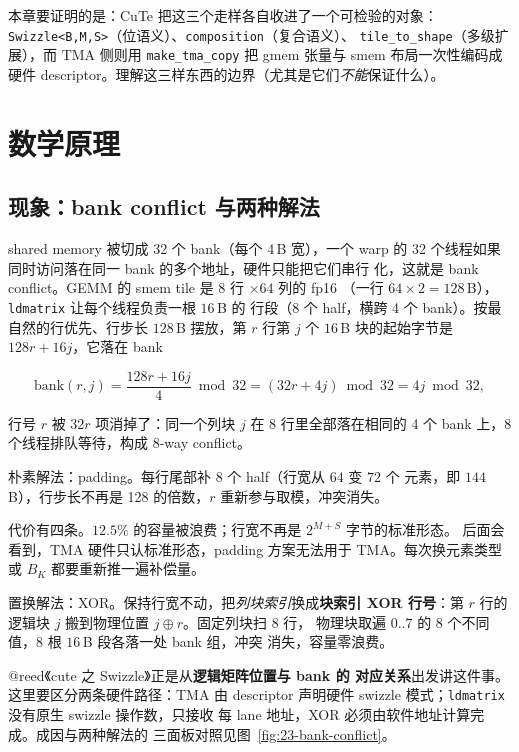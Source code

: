 本章要证明的是：CuTe 把这三个走样各自收进了一个可检验的对象：
\texttt{Swizzle\allowbreak{}<B,\allowbreak{}M,\allowbreak{}S>}（位语义）、\texttt{composition}（复合语义）、
\texttt{tile\_\allowbreak{}to\_\allowbreak{}shape}（多级扩展），而 TMA 侧则用
\texttt{make\_\allowbreak{}tma\_\allowbreak{}copy} 把 gmem 张量与 smem 布局一次性编码成硬件
descriptor。理解这三样东西的边界（尤其是它们\emph{不能}保证什么）。

\section{数学原理}

\subsection{现象：bank conflict 与两种解法}

shared memory 被切成 32 个 bank（每个 4\,B 宽），一个
warp 的 32 个线程如果同时访问落在同一 bank 的多个地址，硬件只能把它们串行
化，这就是 bank conflict。GEMM 的 smem tile 是 $8$ 行 $\times 64$ 列的 fp16
（一行 $64\times2=128$\,B），\texttt{ldmatrix} 让每个线程负责一根 $16$\,B 的
行段（8 个 half，横跨 4 个 bank）。按最自然的行优先、行步长 $128$\,B
摆放，第 $r$ 行第 $j$ 个 $16$\,B 块的起始字节是 $128r+16j$，它落在 bank

\begin{equation}
  \label{eq:23-bank}
  \mathrm{bank}(r,j) = \frac{128r+16j}{4} \bmod 32 = (32r + 4j) \bmod 32
  = 4j \bmod 32 ,
\end{equation}

行号 $r$ 被 $32r$ 项消掉了：同一个列块 $j$ 在 8 行里全部落在相同的
4 个 bank 上，8 个线程排队等待，构成 8-way conflict。

朴素解法：padding。每行尾部补 8 个 half（行宽从 $64$ 变 $72$ 个
元素，即 $144$\,B），行步长不再是 128 的倍数，$r$ 重新参与取模，冲突消失。

代价有四条。$12.5\%$ 的容量被浪费；行宽不再是 $2^{M+S}$ 字节的标准形态。
后面会看到，TMA 硬件只认标准形态，padding 方案无法用于 TMA。每次换元素类型或
$B_K$ 都要重新推一遍补偿量。

置换解法：XOR。保持行宽不动，把\emph{列块索引}换成\textbf{块索引 XOR
行号}：第 $r$ 行的逻辑块 $j$ 搬到物理位置 $j\oplus r$。固定列块扫 8 行，
物理块取遍 $0..7$ 的 8 个不同值，8 根 $16$\,B 段各落一处 bank 组，冲突
消失，容量零浪费。

@reed《cute 之 Swizzle》正是从\textbf{逻辑矩阵位置与 bank 的
对应关系}出发讲这件事。这里要区分两条硬件路径：TMA 由 descriptor
声明硬件 swizzle 模式；\texttt{ldmatrix} 没有原生 swizzle 操作数，只接收
每 lane 地址，XOR 必须由软件地址计算完成。成因与两种解法的
三面板对照见图~\ref{fig:23-bank-conflict}。

